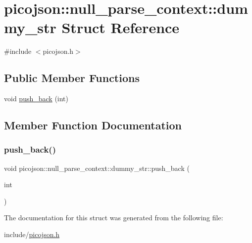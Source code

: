 \hypertarget{structpicojson_1_1null__parse__context_1_1dummy__str}{}\section{picojson\+:\+:null\+\_\+parse\+\_\+context\+:\+:dummy\+\_\+str Struct Reference}
\label{structpicojson_1_1null__parse__context_1_1dummy__str}


{\ttfamily \#include $<$picojson.\+h$>$}

\subsection*{Public Member Functions}
\begin{DoxyCompactItemize}
\item 
void \hyperlink{structpicojson_1_1null__parse__context_1_1dummy__str_ac2b5c5eca1014b268b4c5a2a87d8923c}{push\+\_\+back} (int)
\end{DoxyCompactItemize}


\subsection{Member Function Documentation}
\hypertarget{structpicojson_1_1null__parse__context_1_1dummy__str_ac2b5c5eca1014b268b4c5a2a87d8923c}{}\label{structpicojson_1_1null__parse__context_1_1dummy__str_ac2b5c5eca1014b268b4c5a2a87d8923c} 
\subsubsection{\texorpdfstring{push\+\_\+back()}{push\_back()}}
{\footnotesize\ttfamily void picojson\+::null\+\_\+parse\+\_\+context\+::dummy\+\_\+str\+::push\+\_\+back (\begin{DoxyParamCaption}\item[{int}]{ }\end{DoxyParamCaption})\hspace{0.3cm}{\ttfamily [inline]}}



The documentation for this struct was generated from the following file\+:\begin{DoxyCompactItemize}
\item 
include/\hyperlink{picojson_8h}{picojson.\+h}\end{DoxyCompactItemize}
